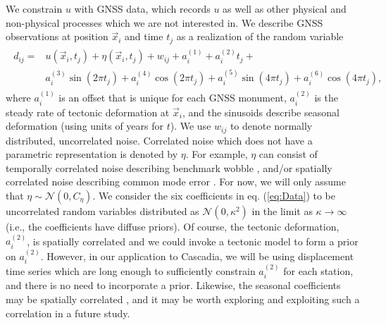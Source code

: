 \documentclass[10pt,letter]{article}
\begin{document}
We constrain $u$ with GNSS data, which records $u$ as well as other physical and non-physical processes which we are not interested in. We describe GNSS observations at position $\vec{x}_i$ and time $t_j$ as a realization of the random variable 
\begin{align}\label{eq:Data}
\begin{split}
d_{ij} = &u(\vec{x}_i,t_j) + \eta(\vec{x}_i,t_j) + w_{ij} + a^{(1)}_i + a^{(2)}_it_j + \\
         &a^{(3)}_i\sin(2 \pi t_j) + a^{(4)}_i\cos(2 \pi t_j) + a^{(5)}_i\sin(4 \pi t_j) + a^{(6)}_i\cos(4 \pi t_j), 
\end{split}
\end{align}
where $a^{(1)}_{i}$ is an offset that is unique for each GNSS monument, $a^{(2)}_{i}$ is the steady rate of tectonic deformation at $\vec{x}_i$, and the sinusoids describe seasonal deformation (using units of years for $t$). We use $w_{ij}$ to denote normally distributed, uncorrelated noise. Correlated noise which does not have a parametric representation is denoted by $\eta$.  For example, $\eta$ can consist of temporally correlated noise describing benchmark wobble \citep[e.g.,][]{Wyatt1982,Wyatt1989}, and/or spatially correlated noise describing common mode error \citep[e.g.,][]{Wdowinski1997}. For now, we will only assume that $\eta \sim \mathcal{N}(0,C_\eta)$. We consider the six coefficients in eq. (\ref{eq:Data}) to be uncorrelated random variables distributed as $\mathcal{N}(0,\kappa^2)$ in the limit as $\kappa \to \infty$ (i.e., the coefficients have diffuse priors). Of course, the tectonic deformation, $a^{(2)}_{i}$, is spatially correlated and we could invoke a tectonic model to form a prior on $a^{(2)}_{i}$. However, in our application to Cascadia, we will be using displacement time series which are long enough to sufficiently constrain $a^{(2)}_{i}$ for each station, and there is no need to incorporate a prior. Likewise, the seasonal coefficients may be spatially correlated \citep{Langbein2008}, and it may be worth exploring and exploiting such a correlation in a future study. 
\end{document}
